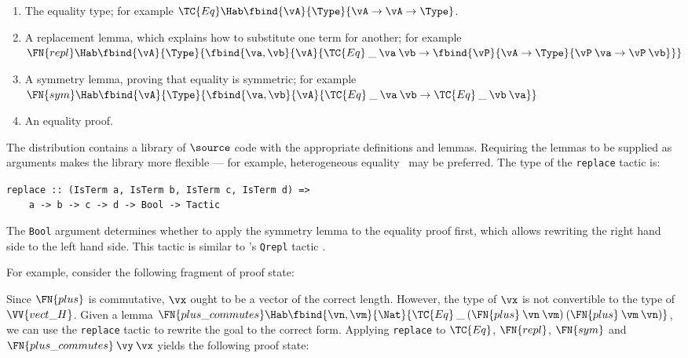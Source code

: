 \begin{enumerate}
\item The equality type; for example
  $\TC{Eq}\Hab\fbind{\vA}{\Type}{\vA\to\vA\to\Type}$.
\item A replacement lemma, which explains how to substitute one term
  for another; for example\\
  $\FN{repl}\Hab\fbind{\vA}{\Type}{
    \fbind{\va,\vb}{\vA}{
	\TC{Eq}\:\_\:\va\:\vb\to\fbind{\vP}{\vA\to\Type}{
	  \vP\:\va\to\vP\:\vb}}}$
\item A symmetry lemma, proving that equality is symmetric; for
  example\\
  $\FN{sym}\Hab\fbind{\vA}{\Type}{
      \fbind{\va,\vb}{\vA}{\TC{Eq}\:\_\:\va\:\vb\to\TC{Eq}\:\_\:\vb\:\va}}$
\item An equality proof.
\end{enumerate}

The \Ivor{} distribution contains a library of $\source$ code with the
appropriate definitions and lemmas. Requiring the lemmas to be
supplied as arguments makes the library more flexible --- for example,
heterogeneous equality~\cite{mcbride-thesis} may be preferred.  The
type of the \texttt{replace} tactic is:

\verb+replace :: (IsTerm a, IsTerm b, IsTerm c, IsTerm d) =>+\\
\verb+    a -> b -> c -> d -> Bool -> Tactic+

The \texttt{Bool} argument determines whether to apply the symmetry
lemma to the equality proof first, which allows rewriting the right
hand side to the left hand side. This  tactic is
similar to \Lego{}'s \texttt{Qrepl} tactic \cite{lego-manual}.

For example, consider the following fragment of proof state:


Since $\FN{plus}$ is commutative, $\vx$ ought to be a vector of the
correct length. However, the type of $\vx$ is not convertible to the
type of $\VV{vect\_H}$. Given a lemma $\FN{plus\_commutes}\Hab
\fbind{\vn,\vm}{\Nat}{\TC{Eq}\:\_\:(\FN{plus}\:\vn\:\vm)\:(\FN{plus}\:\vm\:\vn)}$,
we can use the \texttt{replace} tactic to rewrite the goal to the
correct form. Applying \texttt{replace} to $\TC{Eq}$, $\FN{repl}$,
$\FN{sym}$ and $\FN{plus\_commutes}\:\vy\:\vx$ yields the following
proof state:

